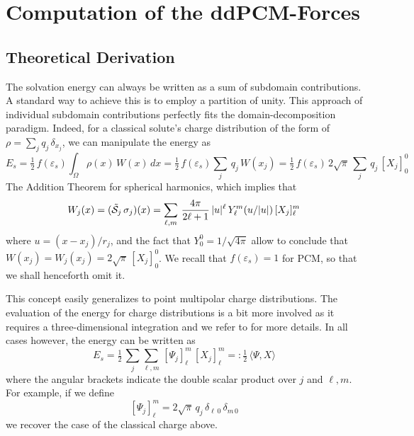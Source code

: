 \section{Computation of the ddPCM-Forces}\label{sec:forces}

\subsection{Theoretical Derivation}

The solvation energy can always be written as a sum of subdomain contributions. A standard way to achieve this is to employ a partition of unity. This  approach of individual subdomain contributions perfectly fits the domain-decomposition paradigm. Indeed, for a classical solute's charge distribution of the form of $\rho=\sum_j q_j \, \delta_{x_j}$, we can manipulate the energy as
\[
	E_s 
	= \tfrac{1}{2} \, f(\varepsilon_s)  \int_{\Omega} \rho(x) \, W(x) \, dx
	= \tfrac{1}{2} \, f(\varepsilon_s) \sum_j \, q_j \,  W(x_j)
	= \tfrac{1}{2} \, f(\varepsilon_s) \,{2\sqrt{\pi}}\, \sum_j  \,q_j \, [X_j]_0^0
\]
The Addition Theorem for spherical harmonics, which implies that
\[
W_j(x) = (\tilde{\mathcal{S}}_j \, \sigma_j)(x)  = \sum_{\ell,m} \, \frac{4\pi}{ 2\ell + 1} \, |u|^\ell \, Y_\ell^m(u/|u|) \, [X_j]_\ell^m
\]
where $u = (x-x_j)/r_j$, and the fact that $Y_0^0 = 1/ \sqrt{4\pi}$ allow to conclude that $W(x_j) = W_j(x_j) = 2 \sqrt{\pi} \, [X_j]_0^0$. We recall that $f(\varepsilon_s) =1$ for PCM, so that we shall henceforth omit it.

This concept easily generalizes to point multipolar charge distributions. 
The evaluation of the energy for charge distributions is a bit more involved as it requires a three-dimensional integration and we refer to \cite{Lipparini_JCP_ddCOSMO-QM} for more details. In all cases however, the energy can be written as
\[
E_s = \tfrac{1}{2}
 \, \sum_j \sum_{\ell,m} \, [\Psi_j]_\ell^m \,[X_j]_\ell^m
  =: \tfrac{1}{2} 
  \,\langle \Psi, X \rangle
\]
where the angular brackets indicate the double scalar product over $j$ and $\ell,m$.
For example, if we define
\[
	[\Psi_j]_\ell^m = 2{\sqrt{\pi}}\, q_j \, \delta_{\ell\,0} \,\delta_{m\,0}
\]
we recover the case of  the classical charge above.

